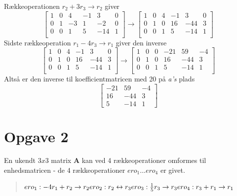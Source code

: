 \documentclass[12pt]{article}
\begin{document}
Rækkeoperationen $r_2+3r_3 \to r_2$ giver
$$
\left[\begin{array}{rrr|rrr}
1&0&4&-1&3&0\\
0&1&-3&1&-2&0\\
0&0&1&5&-14&1\\
\end{array}\right]
\to
\left[\begin{array}{rrr|rrr}
1&0&4&-1&3&0\\
0&1&0&16&-44&3\\
0&0&1&5&-14&1\\
\end{array}\right]
$$
Sidste rækkeoperation $r_1-4r_3 \to r_1$ giver den inverse
$$
\left[\begin{array}{rrr|rrr}
1&0&4&-1&3&0\\
0&1&0&16&-44&3\\
0&0&1&5&-14&1\\
\end{array}\right]
\to
\left[\begin{array}{rrr|rrr}
1&0&0&-21&59&-4\\
0&1&0&16&-44&3\\
0&0&1&5&-14&1\\
\end{array}\right]
$$
Altså er den inverse til koefficientmatricen med 20 på \textit{a's} plads 
$$
\left[\begin{array}{rrr}
-21&59&-4\\
16&-44&3\\
5&-14&1
\end{array}\right]
$$

\newpage
\section{Opgave 2}
En ukendt $3x3$ matrix \textbf{A} kan ved 4 rækkeoperationer omformes til enhedsmatricen - de 4 rækkeoperationer $ero_1...ero_4$ er givet.
\begin{quote}
$
ero_1:-4r_1+r_2 \to r_2 \\
ero_2:r_2 \leftrightarrow r_3 \\
ero_3:\tfrac{1}{5}r_3 \to r_3 \\
ero_4:r_3+r_1 \to r_1
$
\end{quote}
\end{document}

